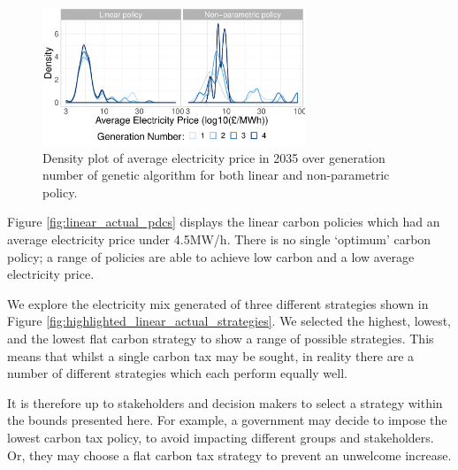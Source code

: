 \begin{figure}
	\centering
	\includegraphics[width=0.7\textwidth,]{Chapter6/figures/results/linear_and_free_ga_development_distribution_avg_elec_price.pdf}
	\caption{Density plot of average electricity price in 2035 over generation number of genetic algorithm for both linear and non-parametric policy.}
	\label{fig:comparison_of_distributions}
\end{figure}

Figure \ref{fig:linear_actual_pdcs} displays the linear carbon policies which had an average electricity price under \textsterling4.5MW/h. There is no single `optimum' carbon policy; a range of policies are able to achieve low carbon and a low average electricity price.


We explore the electricity mix generated of three different strategies shown in Figure \ref{fig:highlighted_linear_actual_strategies}. We selected the highest, lowest, and the lowest flat carbon strategy to show a range of possible strategies. This means that whilst a single carbon tax may be sought, in reality there are a number of different strategies which each perform equally well. 

It is therefore up to stakeholders and decision makers to select a strategy within the bounds presented here. For example, a government may decide to impose the lowest carbon tax policy, to avoid impacting different groups and stakeholders. Or, they may choose a flat carbon tax strategy to prevent an unwelcome increase. 



%






